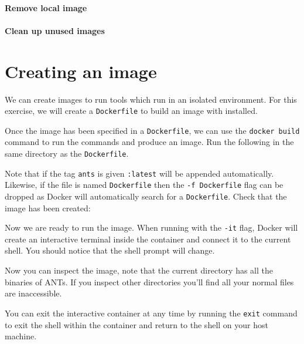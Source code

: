 \documentclass{csse4400}
\begin{document}

\paragraph{Remove local image}


\paragraph{Clean up unused images}


\section{Creating an image}

We can create images to run tools which run in an isolated environment.
For this exercise,
we will create a \texttt{Dockerfile} to build an image with
installed.


Once the image has been specified in a \texttt{Dockerfile},
we can use the \texttt{docker build} command to run the commands and produce an image.
Run the following in the same directory as the \texttt{Dockerfile}.


Note that if the tag \texttt{ants} is given \texttt{:latest} will be appended automatically.
Likewise, if the file is named \texttt{Dockerfile} then the \texttt{-f Dockerfile} flag can be dropped as Docker will automatically search for a \texttt{Dockerfile}.
Check that the image has been created:


Now we are ready to run the image.
When running with the \texttt{-it} flag,
Docker will create an interactive terminal inside the container and connect it to the current shell.
You should notice that the shell prompt will change.


Now you can inspect the image,
note that the current directory has all the binaries of ANTs.
If you inspect other directories you'll find all your normal files are inaccessible.

You can exit the interactive container at any time by running the \texttt{exit} command to exit the shell within the container and return to the shell on your host machine.
\end{document}
